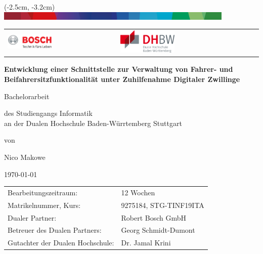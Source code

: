 \begin{titlepage}
	\begin{center}
		\begin{textblock*}{210mm}(-2.5cm, -3.2cm)
			\includegraphics[width=\paperwidth, height=4mm]{resources/logos/Bosch-Supergraphic-Crop}
		\end{textblock*}
	\end{center}

	\vspace{-2.0cm}
	\begin{table}[h]
		\centering
		\begin{tabular}{p{}p{}p{}}
				\includegraphics[width=0.45\textwidth]{resources/logos/Bosch-Logo-Ohne-Supergraphic} & &
				\raggedright
				\includegraphics[width=0.4\textwidth]{resources/logos/DHBW-Logo}
		\end{tabular}
	\end{table}
		
	\begin{center}
		\LARGE
		\vspace*{1.5cm}
		
		\textbf{Entwicklung einer Schnittstelle zur Verwaltung von Fahrer- und Beifahrersitzfunktionalität unter Zuhilfenahme Digitaler Zwillinge}
		
		\vspace{1cm}
		\Large
		Bachelorarbeit
	
		\large
		\vspace{1cm}
		des Studiengangs Informatik \\ an der Dualen Hochschule Baden-Würrtemberg Stuttgart
		
		\vspace{1cm}
		von
		
		\Large
		\vspace{1cm}
		Nico Makowe
		
		\vspace{1cm}
		\today
		
		\vfill
		\large
		\begin{tabular}{l l}
			Bearbeitungszeitraum: & 12 Wochen \\
			Matrikelnummer, Kurs: & 9275184, STG-TINF19ITA \\
			Dualer Partner: & Robert Bosch GmbH \\
			Betreuer des Dualen Partners: & Georg Schmidt-Dumont\\
			Gutachter der Dualen Hochschule: & Dr. Jamal Krini
		\end{tabular}
	\end{center}
\end{titlepage}